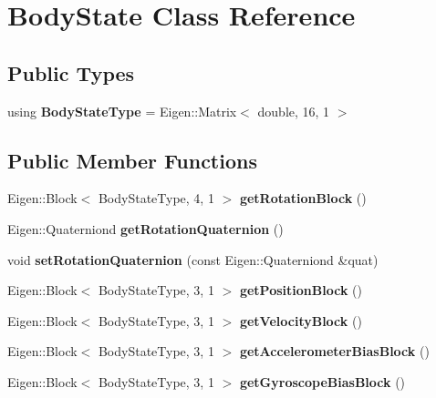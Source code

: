 \hypertarget{class_body_state}{\section{Body\-State Class Reference}
\label{class_body_state}
}
\subsection*{Public Types}
\begin{DoxyCompactItemize}
\item 
\hypertarget{class_body_state_ac95355c4974335a6f69da770d2de30e0}{using {\bfseries Body\-State\-Type} = Eigen\-::\-Matrix$<$ double, 16, 1 $>$}\label{class_body_state_ac95355c4974335a6f69da770d2de30e0}

\end{DoxyCompactItemize}
\subsection*{Public Member Functions}
\begin{DoxyCompactItemize}
\item 
\hypertarget{class_body_state_a980cbcae469aa1fc0d7efec5248db0d1}{Eigen\-::\-Block$<$ Body\-State\-Type, 4, 1 $>$ {\bfseries get\-Rotation\-Block} ()}\label{class_body_state_a980cbcae469aa1fc0d7efec5248db0d1}

\item 
\hypertarget{class_body_state_a63c1a3704285d7e76a7d7f5a2e4cbafa}{Eigen\-::\-Quaterniond {\bfseries get\-Rotation\-Quaternion} ()}\label{class_body_state_a63c1a3704285d7e76a7d7f5a2e4cbafa}

\item 
\hypertarget{class_body_state_ac1931ea582df06676f52ed72ec26140a}{void {\bfseries set\-Rotation\-Quaternion} (const Eigen\-::\-Quaterniond \&quat)}\label{class_body_state_ac1931ea582df06676f52ed72ec26140a}

\item 
\hypertarget{class_body_state_a1b44594cf450da4c6aa2af1b74fa254a}{Eigen\-::\-Block$<$ Body\-State\-Type, 3, 1 $>$ {\bfseries get\-Position\-Block} ()}\label{class_body_state_a1b44594cf450da4c6aa2af1b74fa254a}

\item 
\hypertarget{class_body_state_a732c36a0723224c49a0b2629081bd26d}{Eigen\-::\-Block$<$ Body\-State\-Type, 3, 1 $>$ {\bfseries get\-Velocity\-Block} ()}\label{class_body_state_a732c36a0723224c49a0b2629081bd26d}

\item 
\hypertarget{class_body_state_adfdecc372089f557d447d9d8e910591f}{Eigen\-::\-Block$<$ Body\-State\-Type, 3, 1 $>$ {\bfseries get\-Accelerometer\-Bias\-Block} ()}\label{class_body_state_adfdecc372089f557d447d9d8e910591f}

\item 
\hypertarget{class_body_state_afd17dde9368642923d7d2c0e49b3afd2}{Eigen\-::\-Block$<$ Body\-State\-Type, 3, 1 $>$ {\bfseries get\-Gyroscope\-Bias\-Block} ()}\label{class_body_state_afd17dde9368642923d7d2c0e49b3afd2}

\end{DoxyCompactItemize}


